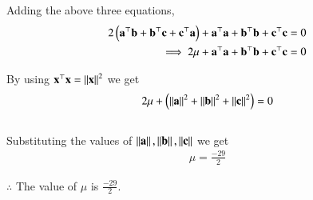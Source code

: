 \documentclass[journal]{IEEEtran}
\begin{document}
Adding the above three equations,
\begin{align}
    2\left(\mathbf{a}^\top\mathbf{b}+\mathbf{b}^\top\mathbf{c}+\mathbf{c}^\top\mathbf{a}\right) + \mathbf{a}^\top\mathbf{a}+\mathbf{b}^\top\mathbf{b}+\mathbf{c}^\top\mathbf{c} &= 0\\
   \implies 2\mu + \mathbf{a}^\top\mathbf{a}+\mathbf{b}^\top\mathbf{b}+\mathbf{c}^\top\mathbf{c} &= 0
\end{align}

By using $\mathbf{x}^\top\mathbf{x} = \left\lVert\mathbf{x}\right\rVert^2$ we get
\begin{align}
    2\mu + \left(\left\lVert\mathbf{a}\right\rVert^2 + \left\lVert\mathbf{b}\right\rVert^2 + \left\lVert\mathbf{c}\right\rVert^2\right) = 0
\end{align}\\

Substituting the values of $\left\lVert\mathbf{a}\right\rVert, \left\lVert\mathbf{b}\right\rVert, \left\lVert\mathbf{c}\right\rVert$ we get
\begin{align}
  \mu = \frac{-29}{2}
\end{align}

$\therefore$ The value of $\mu$ is $\frac{-29}{2}$.
\end{document}
